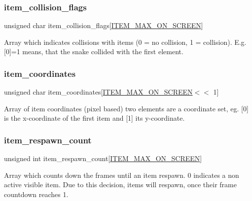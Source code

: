 \subsubsection{\texorpdfstring{item\+\_\+collision\+\_\+flags}{item\_collision\_flags}}
{\footnotesize\ttfamily unsigned char item\+\_\+collision\+\_\+flags\mbox{[}\hyperlink{macros_8h_a7e03b7d3541424447645569c949aacba}{I\+T\+E\+M\+\_\+\+M\+A\+X\+\_\+\+O\+N\+\_\+\+S\+C\+R\+E\+EN}\mbox{]}}

Array which indicates collisions with items (0 = no collision, 1 = collision). E.\+g. \mbox{[}0\mbox{]}=1 means, that the snake collided with the first element. \hypertarget{structitems__struct_ae3d624d3f41bdcd547bbf2c93cac857a}{}\label{structitems__struct_ae3d624d3f41bdcd547bbf2c93cac857a} 
\subsubsection{\texorpdfstring{item\+\_\+coordinates}{item\_coordinates}}
{\footnotesize\ttfamily unsigned char item\+\_\+coordinates\mbox{[}\hyperlink{macros_8h_a7e03b7d3541424447645569c949aacba}{I\+T\+E\+M\+\_\+\+M\+A\+X\+\_\+\+O\+N\+\_\+\+S\+C\+R\+E\+EN}$<$$<$ 1\mbox{]}}

Array of item coordinates (pixel based) two elements are a coordinate set, eg. \mbox{[}0\mbox{]} is the x-\/coordinate of the first item and \mbox{[}1\mbox{]} its y-\/coordinate. \hypertarget{structitems__struct_a1c6ded913b15bdbde6b7e4e1d335323c}{}\label{structitems__struct_a1c6ded913b15bdbde6b7e4e1d335323c} 
\subsubsection{\texorpdfstring{item\+\_\+respawn\+\_\+count}{item\_respawn\_count}}
{\footnotesize\ttfamily unsigned int item\+\_\+respawn\+\_\+count\mbox{[}\hyperlink{macros_8h_a7e03b7d3541424447645569c949aacba}{I\+T\+E\+M\+\_\+\+M\+A\+X\+\_\+\+O\+N\+\_\+\+S\+C\+R\+E\+EN}\mbox{]}}

Array which counts down the frames until an item respawn. 0 indicates a non active visible item. Due to this decision, items will respawn, once their frame countdown reaches 1. \hypertarget{structitems__struct_a82d1c6f853d57e8c61d32ed8751c17b7}{}\label{structitems__struct_a82d1c6f853d57e8c61d32ed8751c17b7} 
